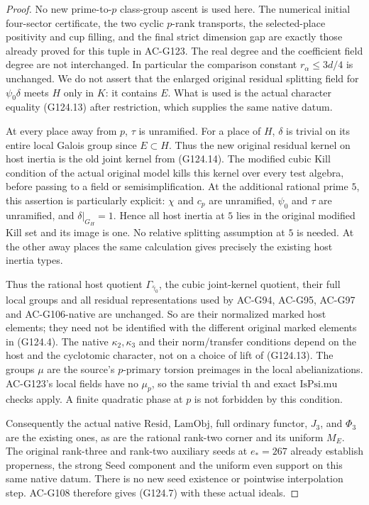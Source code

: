 \begin{proof}
No new prime-to-\(p\) class-group ascent is used here.
The numerical initial four-sector certificate, the two cyclic
\(p\)-rank transports, the selected-place positivity and cup
filling, and the final strict dimension gap are exactly those
already proved for this tuple in AC-G123.
The real degree and the coefficient field degree are not
interchanged.  In particular the comparison constant
\(r_\alpha\le3d/4\) is unchanged.
We do not assert that the enlarged original residual splitting
field for \(\psi_0\delta\) meets \(H\) only in \(K\): it
contains \(E\).  What is used is the actual character equality
(G124.13) after restriction, which supplies the same native datum.

At every place away from \(p\), \(\tau\) is unramified.
For a place of \(H\), \(\delta\) is trivial on its entire local
Galois group since \(E\subset H\).  Thus the new original
residual kernel on host inertia is the old joint kernel from
(G124.14).  The modified cubic \(\mathrm{Kill}\) condition of
the actual original model kills this kernel over every test
algebra, before passing to a field or semisimplification.
At the additional rational prime \(5\), this assertion is
particularly explicit: \(\chi\) and \(c_p\) are unramified,
\(\psi_0\) and \(\tau\) are unramified, and
\(\delta|_{G_H}=1\).  Hence all host inertia at \(5\) lies
in the original modified \(\mathrm{Kill}\) set and its image
is one.  No relative splitting assumption at \(5\) is needed.
At the other away places the same calculation gives precisely
the existing host inertia types.

Thus the rational host quotient \(\Gamma_{\bar\gamma_0}\),
the cubic joint-kernel quotient, their full local groups and
all residual representations used by AC-G94, AC-G95, AC-G97
and AC-G106-native are unchanged.  So are their normalized
marked host elements; they need not be identified with the
different original marked elements in (G124.4).
The native \(\kappa_2,\kappa_3\) and their norm/transfer
conditions depend on the host and the cyclotomic character,
not on a choice of lift of (G124.13).  The groups \(\mu\)
are the source's \(p\)-primary torsion preimages in the local
abelianizations.  AC-G123's local fields have no \(\mu_p\),
so the same trivial \(\mathrm{th}\) and exact
\(\mathrm{IsPsi.mu}\) checks apply.  A finite quadratic
phase at \(p\) is not forbidden by this condition.

Consequently the actual native \(\mathrm{Resid}\),
\(\mathrm{LamObj}\), full ordinary functor, \(J_3\), and
\(\Phi_3\) are the existing ones, as are the rational rank-two
corner and its uniform \(M_E\).  The original rank-three and
rank-two auxiliary seeds at \(e_*=267\) already establish
properness, the strong Seed component and the uniform even
support on this same native datum.  There is no new seed
existence or pointwise interpolation step.
AC-G108 therefore gives (G124.7) with these actual ideals.


\end{proof}
